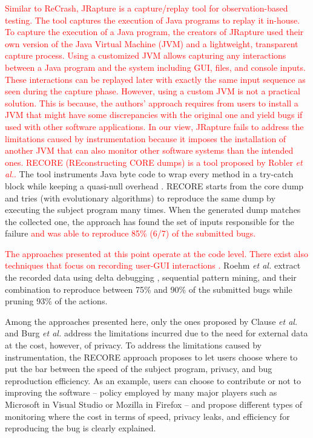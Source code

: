 \documentclass[times, doublespace]{smrauth}
\newcommand{\red}[1]{\textcolor{red}{#1}}
\begin{document}
\red{Similar to ReCrash, JRapture \cite{Steven2000} is a capture/replay tool for observation-based testing. The tool captures the execution of Java programs to replay it in-house. To capture the execution of a Java program, the creators of JRapture used their own version of the Java Virtual Machine (JVM) and a lightweight, transparent capture process.
Using a customized JVM allows capturing any interactions between a Java program and the system including GUI, files, and console inputs.
These interactions can be replayed later  with exactly the same input sequence as seen during the capture phase.
However, using a custom JVM is not a practical solution. This is because, the authors' approach requires from users to install a JVM that might have some discrepancies with the original one and yield bugs if used with other software applications.
In our view,  JRapture fails to address the limitations caused
by instrumentation because it imposes the installation of another
JVM that can also monitor other software systems than the intended ones.
RECORE (REconstructing CORE dumps) is a tool proposed by Robler {\it et al.}.} The tool instruments Java byte code to wrap every method in a try-catch block while keeping a quasi-null overhead \cite{Rossler2013}. RECORE starts from the core dump and tries (with evolutionary algorithms) to reproduce the same dump by executing the subject program many times. When the generated dump matches the collected one, the approach has found the set of inputs responsible for the failure \red{and was able to reproduce 85\% (6/7) of the submitted bugs.}

\red{The approaches presented at this point operate at the code level.
There exist also techniques that focus on recording user-GUI interactions \cite{Herbold2011,Roehm2015}.}
Roehm {\it et al.} extract the recorded data using delta debugging \cite{Zeller2002}, sequential pattern mining, and their combination to reproduce between 75\% and 90\% of the submitted bugs while pruning 93\% of the actions.

Among the approaches presented here, only the ones proposed by Clause {\it et al.} and Burg {\it et al.} address the limitations incurred due to the need for external data  at the cost, however, of privacy. To address the limitations caused by instrumentation,  the RECORE approach proposes to let users choose where to put the bar between the speed of the subject program, privacy, and bug reproduction efficiency. As an example, users can choose to contribute or not to improving the software -- policy employed by many major players such as Microsoft in Visual Studio or Mozilla in Firefox -- and propose different types of monitoring where the cost in terms of speed, privacy leaks, and efficiency for reproducing the bug is clearly explained.
\end{document}

